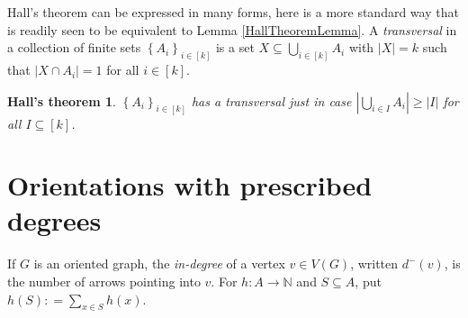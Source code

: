 \documentclass[openany]{tufte-book} %
\theoremstyle{plain}
\newtheorem*{HallsTheorem}{Hall's theorem}
\newcommand{\set}[1]{\left\{ #1 \right\}}
\newcommand{\card}[1]{\left|#1\right|}
\newcommand{\func}[3]{#1\colon #2 \rightarrow #3}
\newcommand{\irange}[1]{\left[#1\right]}
\newcommand{\DefinedAs}{\mathrel{\mathop:}=}
\newcommand{\IN}{\mathbb{N}}
\begin{document}
Hall's theorem can be expressed in many forms, here is a more standard way that is readily seen to be equivalent to Lemma \ref{HallTheoremLemma}. A \emph{transversal} in a collection 
of finite sets $\set{A_i}_{i \in \irange{k}}$ is a set $X \subseteq \bigcup_{i \in \irange{k}} A_i$ with $\card{X} = k$ such that $\card{X \cap A_i} = 1$
for all $i \in \irange{k}$.
\begin{HallsTheorem}
$\set{A_i}_{i \in \irange{k}}$ has a transversal just in case $\card{\bigcup_{i \in I} A_i} \ge \card{I}$ for all $I \subseteq \irange{k}$.
\end{HallsTheorem}

\section{Orientations with prescribed degrees}
If $G$ is an oriented graph, the \emph{in-degree} of a vertex $v \in V(G)$, written $d^-(v)$, is the number of arrows
pointing into $v$.  For $\func{h}{A}{\IN}$ and $S \subseteq A$, put $h(S) \DefinedAs \sum_{x \in S} h(x)$.
\end{document}

